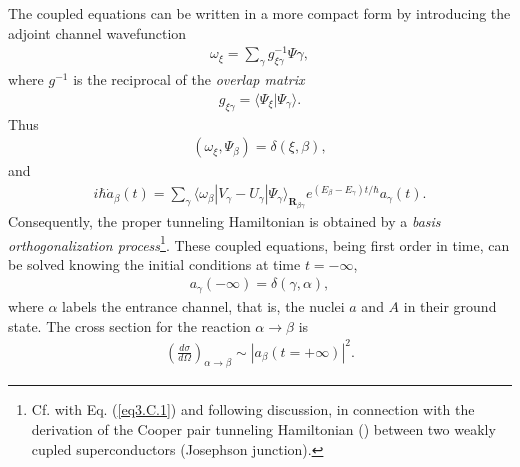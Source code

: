 The coupled equations can be written in a more compact form by introducing the adjoint channel wavefunction 
\begin{align}
\omega_\xi=\sum_{\gamma}g_{\xi\gamma}^{-1}\Psi{\gamma},
\end{align}
where $g^{-1}$ is the reciprocal of the \textit{overlap matrix}
\begin{align}
g_{\xi\gamma}=\langle\Psi_\xi|\Psi_\gamma\rangle.
\end{align}
Thus
\begin{align}
(\omega_\xi,\Psi_\beta)=\delta(\xi,\beta),
\end{align}
and
\begin{align}
i\hbar\dot a_\beta(t)=\sum_{\gamma}\langle\omega_\beta|V_\gamma-U_\gamma|\Psi_\gamma\rangle_{\mathbf R_{\beta\gamma}}e^{(E_\beta-E_\gamma)t/\hbar}a_\gamma(t).
\end{align}
Consequently, the proper tunneling Hamiltonian is obtained by a \textit{basis orthogonalization process}\footnote{Cf. with Eq. (\ref{eq3.C.1}) and following discussion, in connection with the derivation of the Cooper pair tunneling Hamiltonian (\cite{Cohen:62}) between two weakly cupled superconductors (Josephson junction).}. These coupled equations, being first order in time, can be solved knowing the initial conditions at time $t=-\infty$,
\begin{align}
a_\gamma(-\infty)=\delta(\gamma,\alpha),
\end{align}
where $\alpha$ labels the entrance channel, that is, the nuclei $a$ and $A$ in their ground state. The cross section for the reaction $\alpha\rightarrow\beta$ is
\begin{align}
\left(\frac{d\sigma}{d\Omega}\right)_{\alpha\rightarrow\beta}\sim\left|a_\beta(t=+\infty)\right|^2.
\end{align}



